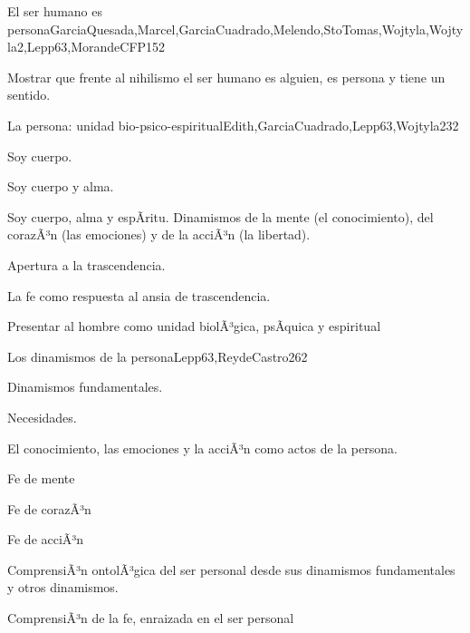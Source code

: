 \begin{syllabus}
\begin{unit}{El ser humano es persona}{GarciaQuesada,Marcel,GarciaCuadrado,Melendo,StoTomas,Wojtyla,Wojtyla2,Lepp63,MorandeCFP}{15}{2}
\begin{unitgoals}
	\item Mostrar que frente al nihilismo el ser humano es alguien, es persona y tiene un sentido.
\end{unitgoals}
\end{unit}

\begin{unit}{La persona: unidad bio-psico-espiritual}{Edith,GarciaCuadrado,Lepp63,Wojtyla2}{3}{2}
\begin{topics}
 		\item Soy cuerpo.
 		\item Soy cuerpo y alma.
 		\item Soy cuerpo, alma y espÃ­ritu.  Dinamismos de la mente (el conocimiento), del corazÃ³n (las emociones) y de la acciÃ³n (la libertad).
 		\item Apertura a la trascendencia.
 		\item La fe como respuesta al ansia de trascendencia.
\end{topics}

\begin{unitgoals}
	\item Presentar al hombre como unidad biolÃ³gica, psÃ­quica y espiritual
\end{unitgoals}
\end{unit}

\begin{unit}{Los dinamismos de la persona}{Lepp63,ReydeCastro2}{6}{2}
\begin{topics}
 	 		\item Dinamismos fundamentales.
 	 		\item Necesidades.
 	 		\item El conocimiento, las emociones y la acciÃ³n como actos de la persona.
 	 		\item Fe de mente
 	 		\item Fe de corazÃ³n
 	 		\item Fe de acciÃ³n
\end{topics}

\begin{unitgoals}
	\item ComprensiÃ³n ontolÃ³gica del ser personal desde sus dinamismos fundamentales y otros dinamismos.
	\item ComprensiÃ³n de la fe, enraizada en el ser personal

\end{unitgoals}
\end{unit}


\end{syllabus}
